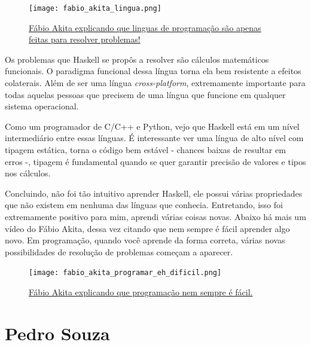 \documentclass[
  article,			       %
  12pt,				         %
  oneside,			       %
  a4paper,			       %
  english,		       	 %
  brazil,			      	 %
  sumario=tradicional
]{abntex2}
\begin{document}
\begin{apendicesenv}
        \begin{figure}[ht]
          \texttt{[image: fabio\_akita\_lingua.png]}
          \caption{\href{https://www.youtube.com/watch?v=p9-WuJbVHHc}{Fábio Akita explicando que linguas de programação são apenas feitas para resolver problemas!}}
        \end{figure}

        Os problemas que Haskell se propôs a resolver são cálculos matemáticos
        funcionais. O paradigma funcional dessa língua torna ela bem resistente a efeitos colaterais. Além de ser uma língua
        \emph{cross-platform}, extremamente importante para todas aquelas pessoas que precisem de uma língua que funcione
        em qualquer sistema operacional. 

        Como um programador de C/C++ e Python, vejo que Haskell está em um nível intermediário entre essas línguas.
        É interessante ver uma língua de alto nível com tipagem estática, torna o código bem estável - chances baixas de 
        resultar em erros -, tipagem é fundamental quando se quer garantir precisão de valores e tipos nos cálculos.

        Concluindo, não foi tão intuitivo aprender Haskell, ele possui várias propriedades que não existem em nenhuma das línguas
        que conhecia. Entretando, isso foi extremamente positivo para mim, aprendi várias coisas novas. Abaixo há
        mais um vídeo do Fábio Akita, dessa vez citando que nem sempre é fácil aprender algo novo. Em programação,
        quando você aprende da forma correta, várias novas possibilidades de resolução de problemas começam a aparecer.

        \begin{figure}[ht]
          \texttt{[image: fabio\_akita\_programar\_eh\_dificil.png]}
          \caption{\href{https://www.youtube.com/watch?v=V7oUDL7E1g4}{Fábio Akita explicando que programação nem sempre é fácil.}}
        \end{figure}

        \newpage

        \chapter{Pedro Souza}
    
    \end{apendicesenv}
\end{document}
